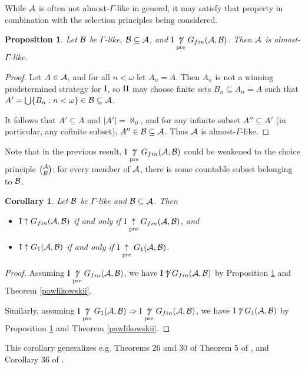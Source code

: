 \documentclass{amsart}
\theoremstyle{plain}
\newtheorem{corollary}[theorem]{Corollary}
\newtheorem{proposition}[theorem]{Proposition}
\theoremstyle{definition}
\theoremstyle{remark}
\theoremstyle{plain}
\theoremstyle{definition}
\theoremstyle{remark}
\begin{document}
While \(\mathcal{A}\) is often not almost-\(\Gamma\)-like in general,
it may satisfy that property in combination with the selection principles
being considered.

\begin{proposition}\label{auto-asl}
Let \(\mathcal{B}\) be \(\Gamma\)-like, \(\mathcal{B}\subseteq\mathcal{A}\),
and \(\mathrm{I}\underset{\text{pre}}{\not\uparrow} G_{fin}(\mathcal{A},\mathcal{B})\). Then
\(\mathcal{A}\) is almost-\(\Gamma\)-like.
\end{proposition}
\begin{proof}
Let \(A\in\mathcal{A}\), and for all \(n<\omega\) let \(A_n=A\).
Then \(A_n\) is not a winning predetermined strategy for
\(\mathrm{I}\), so \(\mathrm{II}\) may choose finite sets
\(B_n\subseteq A_n=A\) such that 
\(A'=\bigcup\{B_n:n<\omega\}\in\mathcal{B}\subseteq\mathcal{A}\).

It follows that \(A'\subseteq A\) and \(|A'|=\aleph_0\), 
and for any infinite subset
\(A''\subseteq A'\) (in particular, any cofinite subset),
\(A''\in\mathcal{B}\subseteq\mathcal{A}\). Thus \(\mathcal{A}\) is almost-\(\Gamma\)-like.
\end{proof}

Note that in the previous result, 
\(\mathrm{I}\underset{\text{pre}}{\not\uparrow} G_{fin}(\mathcal{A},\mathcal{B})\) could be weakened
to the choice principle \({\mathcal{A}}\choose{\mathcal{B}}\): for every
member of \(\mathcal{A}\), there is some countable subset belonging to \(\mathcal{B}\).


\begin{corollary}
Let \(\mathcal{B}\) be \(\Gamma\)-like and \(\mathcal{B}\subseteq\mathcal{A}\).
Then 
\begin{itemize}
\item \(\mathrm{I}\uparrow G_{fin}(\mathcal{A},\mathcal{B})\) if and only if
\(\mathrm{I}\underset{\text{pre}}{\uparrow} G_{fin}(\mathcal{A},\mathcal{B})\), and
\item \(\mathrm{I}\uparrow G_{1}(\mathcal{A},\mathcal{B})\) if and only if
\(\mathrm{I}\underset{\text{pre}}{\uparrow} G_{1}(\mathcal{A},\mathcal{B})\).
\end{itemize}
\end{corollary}
\begin{proof}
Assuming \(\mathrm{I}\underset{\text{pre}}{\not\uparrow} G_{fin}(\mathcal{A},\mathcal{B})\), we have
\(\mathrm{I}\not\uparrow G_{fin}(\mathcal{A},\mathcal{B})\) by Proposition \ref{auto-asl}
and Theorem \ref{pawlikowskii}.

Similarly, assuming \(\mathrm{I}\underset{\text{pre}}{\not\uparrow} G_{1}(\mathcal{A},\mathcal{B})
\Rightarrow\mathrm{I}\underset{\text{pre}}{\not\uparrow} G_{fin}(\mathcal{A},\mathcal{B})\), we have
\(\mathrm{I}\not\uparrow G_{1}(\mathcal{A},\mathcal{B})\) by Proposition \ref{auto-asl}
and Theorem \ref{pawlikowskii}.
\end{proof}

This corollary generalizes e.g. Theorems 26 and 30 of \cite{MR1378387}
Theorem 5 of \cite{MR2119791}, and Corollary 36 of \cite{clontzDualPreprint}.
\end{document}
